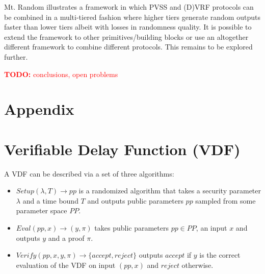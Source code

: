 \documentclass[letterpaper,twocolumn,10pt]{article}
\theoremstyle{definition}
\theoremstyle{remark}
\newcommand{\todo}[1]{\textcolor{red}{\textbf{TODO:} #1}}
\begin{document}
Mt. Random illustrates a framework in which PVSS and (D)VRF protocols can be combined in a multi-tiered fashion where higher tiers generate random outputs faster than lower tiers albeit with losses in randomness quality. It is possible to extend the framework to other primitives/building blocks or use an altogether different framework to combine different protocols. This remains to be explored further.

\todo{conclusions, open problems}

\printbibliography
\appendix
\section*{Appendix}
\renewcommand{\thesection}{\arabic{section}}
\section{Verifiable Delay Function (VDF)}
\label{appendix:vdf}
A VDF \cite{boneh2018verifiable} can be described via a set of three algorithms:
\begin{itemize}
\item $Setup(\lambda, T) \rightarrow pp$ is a randomized algorithm that takes a security parameter $\lambda$ and a time bound $T$  and outputs public parameters $pp$ sampled from some parameter space $PP$.
\item $Eval(pp, x) \rightarrow (y, \pi)$ takes public parameters $pp\in PP$, an input $x$ and outputs $y$ and a proof $\pi$.
\item $Verify(pp, x, y, \pi) \rightarrow \{accept, reject\}$ outputs $accept$ if $y$ is the correct evaluation of the VDF on input $(pp, x)$ and $reject$ otherwise.
\end{itemize}
\end{document}

